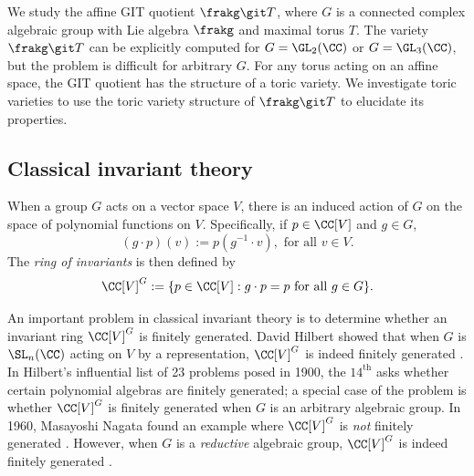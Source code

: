 \documentclass[12pt]{amsart}
\theoremstyle{plain}
\begin{document}
We study the affine GIT quotient $\frakg \git T$, where $G$ is a connected complex algebraic group with Lie algebra $\frakg$ and maximal torus $T$.
The variety $\frakg \git T$ can be explicitly computed for $G = \GL_2(\CC)$ or $G = \GL_3(\CC)$, but the problem is difficult for arbitrary $G$.
For any torus acting on an affine space, the GIT quotient has the structure of a toric variety.
We investigate toric varieties to use the toric variety structure of $\frakg \git T$ to elucidate its properties.


\subsection{Classical invariant theory}
When a group $G$ acts on a vector space $V$, there is an induced action of $G$ on the space of polynomial functions on $V$.
Specifically, if $p \in \CC[V]$ and $g \in G$,
$$(g \cdot p)(v) := p(g^{-1} \cdot v), \text{ for all } v \in V.$$
The \emph{ring of invariants} is then defined by
$$\CC[V]^G := \{p \in \CC[V] : g \cdot p = p \text{ for all } g \in G\}.$$

An important problem in classical invariant theory is to determine whether an invariant ring $\CC[V]^G$ is finitely generated.
David Hilbert showed that when $G$ is $\SL_n(\CC)$ acting on $V$ by a representation, $\CC[V]^G$ is indeed finitely generated \cite{Hilbert90}.
In Hilbert's influential list of 23 problems posed in 1900, the $14^\text{th}$ asks whether certain polynomial algebras are finitely generated;
a special case of the problem is whether $\CC[V]^G$ is finitely generated when $G$ is an arbitrary algebraic group.
In 1960, Masayoshi Nagata found an example where $\CC[V]^G$ is \emph{not} finitely generated \cite{Nagata60}.
However, when $G$ is a \emph{reductive} algebraic group, $\CC[V]^G$ is indeed finitely generated \cite[Theorem 4.51]{Mukai03}.
\end{document}
